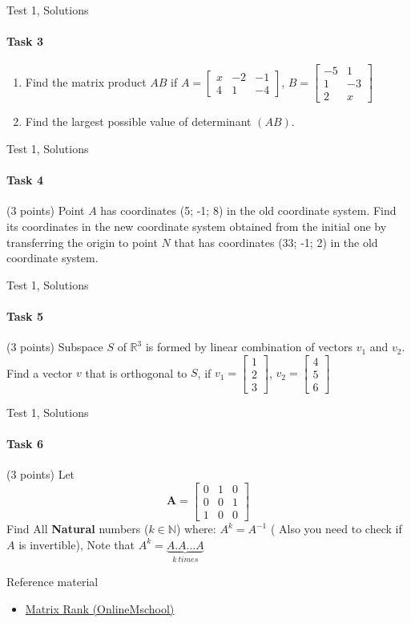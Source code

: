 \documentclass[aspectratio=169,notes]{beamer}
\newcommand{\fbckg}[1]{\usebackgroundtemplate{\texttt{[image: \#1]}}}%
\begin{document}
\begin{frame}[t]{Test 1, Solutions}
    \framesubtitle{Task 3}
    \begin{enumerate}
        \item Find the matrix product $AB$ if $A=\begin{bmatrix}x & -2 & -1 \\ 4 & 1 & -4 \end{bmatrix}$, $B=\begin{bmatrix} -5 & 1 \\ 1 & -3 \\ 2 & x \end{bmatrix}$
        \item Find the largest possible value of determinant $(AB)$.
    \end{enumerate}
    \end{frame}

\begin{frame}[t]{Test 1, Solutions}
\framesubtitle{Task 4}
(3 points)  Point $A$ has coordinates (5; -1; 8) in the old coordinate system. Find its coordinates in the new coordinate system obtained from the initial one by transferring the origin to point $N$ that has coordinates (33; -1; 2) in the old coordinate system.
\end{frame}

\begin{frame}[t]{Test 1, Solutions}
    \framesubtitle{Task 5}
    (3 points) Subspace $S$ of $\mathbb{R}^3$ is formed by linear combination of vectors $v_1$ and $v_2$. Find a vector $v$ that is orthogonal to $S$, if $v_1 = \begin{bmatrix}1 \\ 2\\ 3\end{bmatrix}$, $v_2 = \begin{bmatrix}4 \\ 5\\ 6\end{bmatrix}$
\end{frame}


\begin{frame}[t]{Test 1, Solutions}
    \framesubtitle{Task 6}
    (3 points) Let \begin{equation}
        \mathbf{A}=\begin{bmatrix}
           0  & 1 & 0 \\
           0  & 0 & 1 \\
           1  & 0 & 0 
        \end{bmatrix}
        \end{equation}
    Find All \textbf{Natural} numbers ($k\in \mathbb{N}$) where: $A^k=A^{-1}$ ( Also you need to check if $A$ is invertible), Note that $A^k=\underbrace{A.A \dots A}_{k \ times} $
\end{frame}



\begin{frame}[t]{Reference material}
    \Large
    \begin{itemize}
        \item \href{https://onlinemschool.com/math/library/matrix/rank/}{Matrix Rank (OnlineMschool)}
    \end{itemize}
\end{frame}

\fbckg{fibeamer/figs/last_page.png}
\frame[plain]{}
\end{document}
